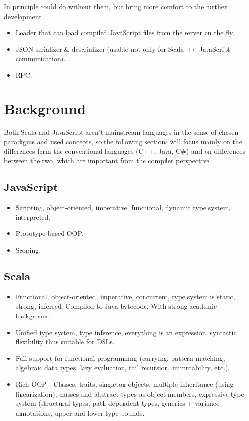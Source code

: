 \documentclass[12pt,a4paper]{report}
\begin{document}
In principle could do without them, but bring more comfort to the further development.

\begin{itemize}
\item Loader that can load compiled JavaScript files from the server on the fly.
\item JSON serializer \& deserializer (usable not only for Scala $\leftrightarrow$ JavaScript communication).
\item RPC.
\end{itemize}



\chapter{Background}

Both Scala and JavaScript aren't mainstream languages in the sense of chosen paradigms and used concepts, so the following sections will focus mainly on the differences form the conventional languages (C++, Java, C\#) and on differences between the two, which are important from the compiler perspective.

\section{JavaScript}

\begin{itemize}
\item Scripting, object-oriented, imperative, functional, dynamic type system, interpreted. 
\item Prototype-based OOP.
\item Scoping.
\end{itemize}

\section{Scala}

\begin{itemize}
\item Functional, object-oriented, imperative, concurrent, type system is static, strong, inferred. Compiled to Java bytecode. With strong academic background.
\item Unified type system, type inference, everything is an expression, syntactic flexibility thus suitable for DSLs.
\item Full support for functional programming (currying, pattern matching, algebraic data types, lazy evaluation, tail recursion, immutability, etc.).
\item Rich OOP - Classes, traits, singleton objects, multiple inheritance (using linearization), classes and abstract types as object members, expressive type system (structural types, path-dependent types, generics + variance annotations, upper and lower type bounds.
\end{itemize}
\end{document}
